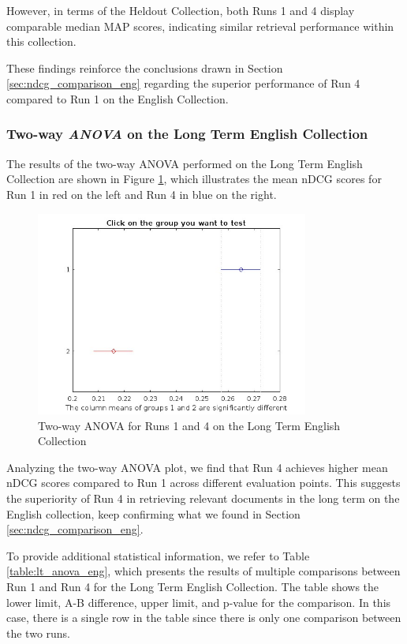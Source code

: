 However, in terms of the Heldout Collection, both Runs 1 and 4 display comparable median \ac{MAP} scores, indicating similar retrieval performance within this collection. 

These findings reinforce the conclusions drawn in Section \ref{sec:ndcg_comparison_eng} regarding the superior performance of Run 4 compared to Run 1 on the English Collection. 

\subsubsection{Two-way \textit{ANOVA} on the Long Term English Collection}

The results of the two-way \ac{ANOVA} performed on the Long Term English Collection are shown in Figure \ref{fig:lt_anova_eng}, which illustrates the mean \ac{nDCG} scores for Run 1 in red on the left and Run 4 in blue on the right. 

\begin{figure}[!h]
\centering
\includegraphics[width=0.8\textwidth]{figure/StatisticalAnalysis/AnovaTwoWay/LT_EN.jpg}
\caption{Two-way ANOVA for Runs 1 and 4 on the Long Term English Collection}
\label{fig:lt_anova_eng}
\end{figure}

Analyzing the two-way \ac{ANOVA} plot, we find that Run 4 achieves higher mean \ac{nDCG} scores compared to Run 1 across different evaluation points. 
This suggests the superiority of Run 4 in retrieving relevant documents in the long term on the English collection, keep confirming what we found in Section \ref{sec:ndcg_comparison_eng}. 

To provide additional statistical information, we refer to Table \ref{table:lt_anova_eng}, which presents the results of multiple comparisons between Run 1 and Run 4 for the Long Term English Collection. 
The table shows the lower limit, A-B difference, upper limit, and p-value for the comparison. 
In this case, there is a single row in the table since there is only one comparison between the two runs.

